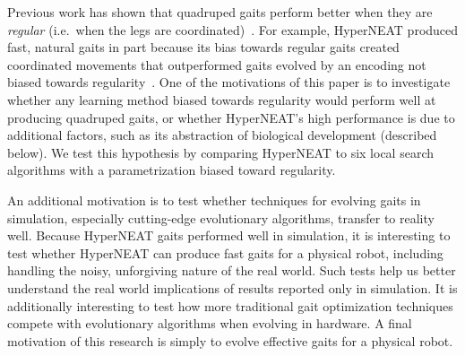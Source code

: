 Previous work has shown that quadruped gaits perform better when they
are \emph{regular} (i.e.\ when the legs are
coordinated)~\citep{clune2009evolving,
  clune2011performance,valsalam2008modular}. For example, HyperNEAT
produced fast, natural gaits in part because its bias towards regular
gaits created coordinated movements that outperformed gaits evolved by
an encoding not biased towards regularity~\citep{clune2009evolving,
  clune2011performance}. One of the motivations of this paper is to
investigate whether any learning method biased towards regularity
would perform well at producing quadruped gaits, or whether
HyperNEAT's high performance is due to additional factors, such as its
abstraction of biological development (described below). We test this
hypothesis by comparing HyperNEAT to six local search algorithms with
a parametrization biased toward regularity.

An additional motivation is to test whether techniques for evolving
gaits in simulation, especially cutting-edge evolutionary algorithms,
transfer to reality well. Because HyperNEAT gaits performed well in
simulation, it is interesting to test whether HyperNEAT can produce fast
gaits for a physical robot, including handling the noisy, unforgiving nature of the real world. Such tests help us better understand the real world implications of results reported only in simulation. It is additionally interesting to test how
more traditional gait optimization techniques compete with
evolutionary algorithms when evolving in hardware. A final motivation of this research is simply to evolve effective gaits for a physical robot.




%  
%  
% 


